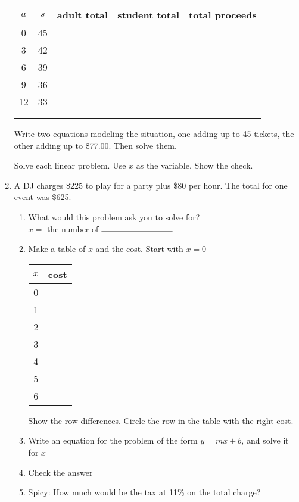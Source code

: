 \documentclass[12pt, oneside]{article}
\begin{document}
\begin{enumerate}
\renewcommand{\arraystretch}{1.6}
\begin{center}
  \begin{tabular}{|c|c|r| r |r|}
  \hline
  $a$ & $s$ & adult total & student total & total proceeds\\
  \hline
  0 & 45 &  &  & \\
  \hline
  3 & 42 &  &  &  \\
  \hline
  6 & 39 &  &  &   \\
  \hline
  9 & 36 &  &  &   \\
  \hline
  12 & 33 &  &  &   \\
  \hline
   &  &  &  &   \\
  \hline
   &  &  &  &   \\
  \hline
  \end{tabular}
\end{center}

Write two equations modeling the situation, one adding up to 45 tickets, the other adding up to \$77.00. Then solve them.

\newpage

Solve each linear problem. Use $x$ as the variable. Show the check.

  \item A DJ charges \$225 to play for a party plus \$80 per hour. The total for one event was \$625.
  \begin{enumerate}
    \item What would this problem ask you to solve for? \\[0.5cm]
    \hspace{1cm} $x=$ the number of $\rule{3cm}{0.15mm}$
    \item Make a table of $x$ and the cost. Start with $x=0$ \\[0.5cm]
    \begin{center}
      \begin{tabular}{|c|r|}
      \hline
      $x$ & cost\\
      \hline
      0 &  \\
      \hline
      1 &  \\
      \hline
      2 &  \\
      \hline
      3 &  \\
      \hline
      4 &  \\
      \hline
      5 &  \\
      \hline
      6 &  \\
      \hline
      \end{tabular}
    \end{center}
    Show the row differences. Circle the row in the table with the right cost.
    \item Write an equation for the problem of the form $y=mx+b$, and solve it for $x$ \vspace{3.5cm}
    \item Check the answer \vspace{2.5cm}
    \item Spicy: How much would be the tax at 11\% on the total charge?
  \end{enumerate}


\end{enumerate}
\end{document}
